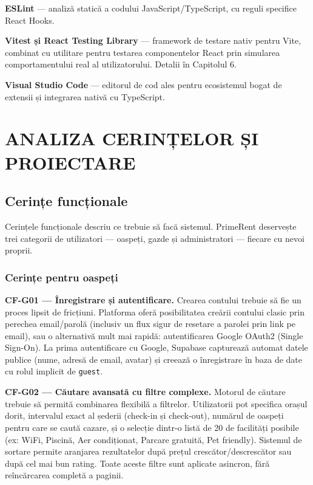 \documentclass[12pt,a4paper,oneside]{report}
\begin{document}
\textbf{ESLint} — analiză statică a codului JavaScript/TypeScript, cu reguli specifice React Hooks.

\textbf{Vitest și React Testing Library} — framework de testare nativ pentru Vite, combinat cu utilitare pentru testarea componentelor React prin simularea comportamentului real al utilizatorului. Detalii în Capitolul 6.

\textbf{Visual Studio Code} — editorul de cod ales pentru ecosistemul bogat de extensii și integrarea nativă cu TypeScript.


\chapter{ANALIZA CERINȚELOR ȘI PROIECTARE}

\section{Cerințe funcționale}

Cerințele funcționale descriu ce trebuie să facă sistemul. PrimeRent deservește trei categorii de utilizatori — oaspeți, gazde și administratori — fiecare cu nevoi proprii.

\subsection{Cerințe pentru oaspeți}

\textbf{CF-G01 — Înregistrare și autentificare.} Crearea contului trebuie să fie un proces lipsit de fricțiuni. Platforma oferă posibilitatea creării contului clasic prin perechea email/parolă (inclusiv un flux sigur de resetare a parolei prin link pe email), sau o alternativă mult mai rapidă: autentificarea Google OAuth2 (Single Sign-On). La prima autentificare cu Google, Supabase capturează automat datele publice (nume, adresă de email, avatar) și creează o înregistrare în baza de date cu rolul implicit de \texttt{guest}.

\textbf{CF-G02 — Căutare avansată cu filtre complexe.} Motorul de căutare trebuie să permită combinarea flexibilă a filtrelor. Utilizatorii pot specifica orașul dorit, intervalul exact al șederii (check-in și check-out), numărul de oaspeți pentru care se caută cazare, și o selecție dintr-o listă de 20 de facilități posibile (ex: WiFi, Piscină, Aer condiționat, Parcare gratuită, Pet friendly). Sistemul de sortare permite aranjarea rezultatelor după prețul crescător/descrescător sau după cel mai bun rating. Toate aceste filtre sunt aplicate asincron, fără reîncărcarea completă a paginii.
\end{document}
